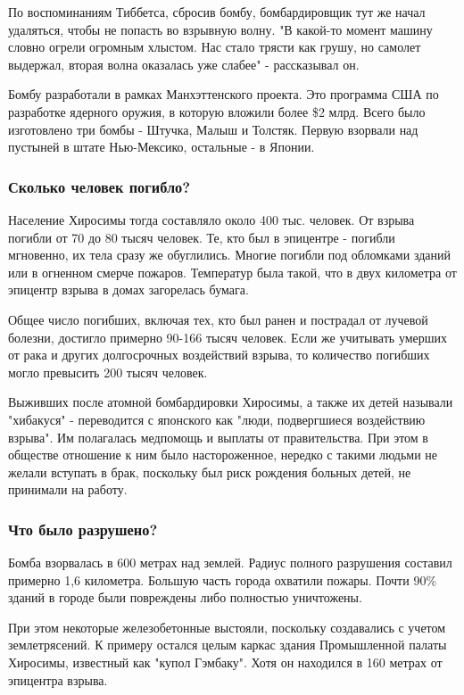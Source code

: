 \documentclass[a4paper,11pt]{extreport}
\begin{document}
По воспоминаниям Тиббетса, сбросив бомбу, бомбардировщик тут же начал
удаляться, чтобы не попасть во взрывную волну. "В какой-то момент машину словно
огрели огромным хлыстом. Нас стало трясти как грушу, но самолет выдержал,
вторая волна оказалась уже слабее" - рассказывал он.

Бомбу разработали в рамках Манхэттенского проекта. Это программа США по
разработке ядерного оружия, в которую вложили более \$2 млрд. Всего было
изготовлено три бомбы - Штучка, Малыш и Толстяк. Первую взорвали над пустыней в
штате Нью-Мексико, остальные - в Японии.

\subsubsection{Сколько человек погибло?}

Население Хиросимы тогда составляло около 400 тыс. человек. От взрыва погибли
от 70 до 80 тысяч человек. Те, кто был в эпицентре - погибли мгновенно, их тела
сразу же обуглились. Многие погибли под обломками зданий или в огненном смерче
пожаров. Температур была такой, что в двух километра от эпицентр взрыва в домах
загорелась бумага.

Общее число погибших, включая тех, кто был ранен и пострадал от лучевой
болезни, достигло примерно 90-166 тысяч человек. Если же учитывать умерших от
рака и других долгосрочных воздействий взрыва, то количество погибших могло
превысить 200 тысяч человек.

Выживших после атомной бомбардировки Хиросимы, а также их детей называли
"хибакуся" -  переводится с японского как "люди, подвергшиеся воздействию
взрыва". Им полагалась медпомощь и выплаты от правительства. При этом в
обществе отношение к ним было настороженное, нередко с такими людьми не желали
вступать в брак, поскольку был риск рождения больных детей, не принимали на
работу.

\subsubsection{Что было разрушено?}

Бомба взорвалась в 600 метрах над землей. Радиус полного разрушения составил
примерно 1,6 километра. Большую часть города охватили пожары. Почти 90\% зданий
в городе были повреждены либо полностью уничтожены.

При этом некоторые железобетонные выстояли, поскольку создавались с учетом
землетрясений. К примеру остался целым каркас здания Промышленной палаты
Хиросимы, известный как "купол Гэмбаку". Хотя он находился в 160 метрах от
эпицентра взрыва.
\end{document}
